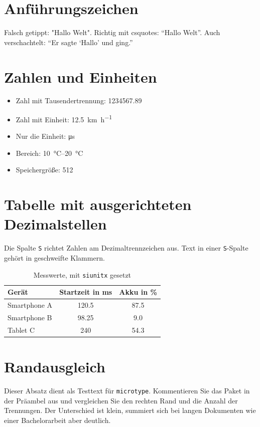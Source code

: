 \documentclass[a4paper,11pt]{article}
\begin{document}
\section*{Anführungszeichen}
Falsch getippt: "Hallo Welt". Richtig mit csquotes: \enquote{Hallo Welt}.
Auch verschachtelt: \enquote{Er sagte \enquote{Hallo} und ging.}

\section*{Zahlen und Einheiten}
\begin{itemize}
  \item Zahl mit Tausendertrennung: \num{1234567.89}
  \item Zahl mit Einheit: \qty{12.5}{\kilo\metre\per\hour}
  \item Nur die Einheit: \unit{\micro\second}
  \item Bereich: \qtyrange{10}{20}{\celsius}
  \item Speichergröße: \qty{512}{\mega\byte}
\end{itemize}

\section*{Tabelle mit ausgerichteten Dezimalstellen}
Die Spalte \texttt{S} richtet Zahlen am Dezimaltrennzeichen aus.
Text in einer \texttt{S}-Spalte gehört in geschweifte Klammern.

\begin{table}[ht]
  \centering
  \begin{tabular}{l S[table-format=3.2] S[table-format=2.1]}
    \toprule
    Gerät & {Startzeit in \unit{\milli\second}} & {Akku in \unit{\percent}} \\
    \midrule
    Smartphone A & 120.5  & 87.5 \\
    Smartphone B &  98.25 &  9.0 \\
    Tablet C     & 240    & 54.3 \\
    \bottomrule
  \end{tabular}
  \caption{Messwerte, mit \texttt{siunitx} gesetzt}
\end{table}

\section*{Randausgleich}
Dieser Absatz dient als Testtext für \texttt{microtype}. Kommentieren Sie das
Paket in der Präambel aus und vergleichen Sie den rechten Rand und die Anzahl
der Trennungen. Der Unterschied ist klein, summiert sich bei langen Dokumenten
wie einer Bachelorarbeit aber deutlich.
\end{document}
